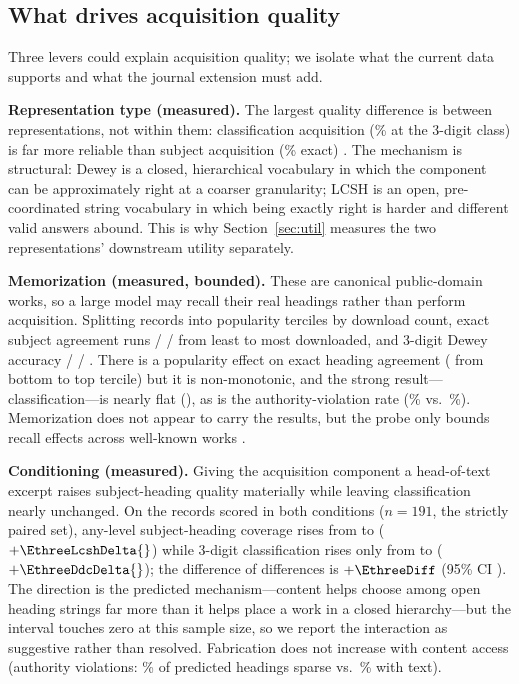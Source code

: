 \subsection{What drives acquisition quality}

Three levers could explain acquisition quality; we isolate what the current
data supports and what the journal extension must add.

\textbf{Representation type (measured).} The largest quality difference is
between representations, not within them: classification acquisition
(\CatDDCClass\% at the 3-digit class) is far more reliable than subject
acquisition (\CatExact\% exact) . The
mechanism is structural: Dewey is a closed, hierarchical vocabulary in
which the component can be approximately right at a coarser granularity;
LCSH is an open, pre-coordinated string vocabulary in which being exactly
right is harder and different valid answers abound. This is why
Section~\ref{sec:util} measures the two representations' downstream utility
separately.

\textbf{Memorization (measured, bounded).} These are canonical
public-domain works, so a large model may recall their real headings rather
than perform acquisition. Splitting records into popularity terciles by
download count, exact subject agreement runs
\PopLowExact{} / \PopMidExact{} / \PopHighExact{} from least to most
downloaded, and 3-digit Dewey accuracy
\PopLowDdc{} / \PopMidDdc{} / \PopHighDdc{}. There is a popularity effect
on exact heading agreement (\PopExactDelta{} from bottom to top tercile)
but it is non-monotonic, and the strong result---classification---is nearly
flat (\PopDdcDelta{}), as is the authority-violation rate
(\PopLowAuth\% vs.\ \PopHighAuth\%). Memorization does not appear to carry
the results, but the probe only bounds recall effects across well-known
works .

\textbf{Conditioning (measured).} Giving the acquisition component a
head-of-text excerpt raises subject-heading quality materially while leaving
classification nearly unchanged. On the records scored in both conditions
($n=191$, the strictly paired set), any-level subject-heading coverage rises
from \EthreeLcshSparse{} to \EthreeLcshFull{} ($+\EthreeLcshDelta{}$)
while 3-digit classification rises only from \EthreeDdcSparse{} to
\EthreeDdcFull{} ($+\EthreeDdcDelta{}$); the difference of differences is
$+\EthreeDiff$ (95\% CI \EthreeDiffCI). The direction is the predicted
mechanism---content helps choose among open heading strings far more than it
helps place a work in a closed hierarchy---but the interval touches zero at
this sample size, so we report the interaction as suggestive rather than
resolved. Fabrication does not increase with content access (authority
violations: \EthreeViolSparse\% of predicted headings sparse vs.\
\EthreeViolFull\% with text).

